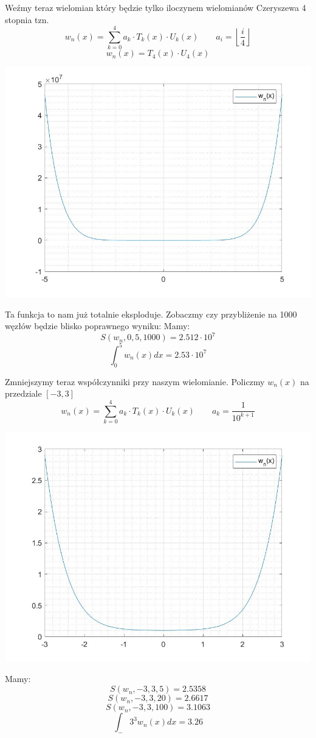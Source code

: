 \documentclass{article}\usepackage{amsmath,amsfonts,amssymb}
\begin{document}
Weźmy teraz wielomian który będzie tylko iloczynem wielomianów Czeryszewa 4 stopnia tzn.
\[ w_{n}(x) = \sum_{k = 0}^{4} a_{k}  \cdot T_{k}(x)  \cdot U_{k}(x) \quad \quad a_{i} = \left \lfloor{\frac{i}{4}}\right \rfloor  \] 
\[ w_{n}(x) =  T_{4}(x)  \cdot U_{4}(x)   \] 
\begin{center}
   \includegraphics[scale=0.3]{trzeci_rysunek.jpg}
\end{center}
Ta funkcja to nam już totalnie eksploduje. Zobaczmy czy przybliżenie na 1000 węzłów będzie blisko poprawnego wyniku:
Mamy:
\[ S(w_{n}, 0, 5, 1000) = 2.512 \cdot10^7 \] 
\[ \int_0^5w_n(x)dx = 2.53\cdot10^7\] 


Zmniejszymy teraz współczynniki przy naszym wielomianie. Policzmy $w_{n}(x)$ na przedziale $[-3,3]$
\[ w_{n}(x) = \sum_{k = 0}^{4} a_{k}  \cdot T_{k}(x)  \cdot U_{k}(x) \quad \quad a_{k} = \frac{1}{10^{k+1}}\] 
\begin{center}
   \includegraphics[scale=0.3]{obrazek_4.jpg}
\end{center}
Mamy:
\[ S(w_{n}, -3, 3, 5) = 2.5358  \] 
\[ S(w_{n}, -3, 3, 20) =  2.6617  \] 
\[ S(w_{n}, -3, 3, 100) =  3.1063  \] 
\[ \int_-3^3w_n(x)dx = 3.26\] 
\end{document}
